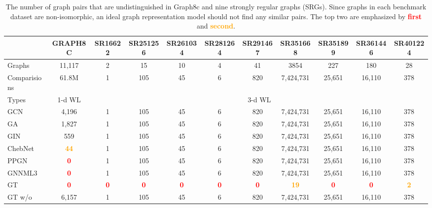 \documentclass[oneside]{article}
\begin{document}
\begin{table*}[t]
\centering
\caption{
The number of graph pairs that are undistinguished in Graph8c and nine 
strongly regular graphs (SRGs).
Since graphs in each benchmark dataset are non-isomorphic, an ideal graph representation model should not find any similar pairs.
The top two are emphasized by \textcolor{red}{\textbf{first}} and \textcolor{orange}{\textbf{second}}.
}

  \begin{adjustbox}{width=1\textwidth}
  \fontsize{10 pt}{13 pt}\selectfont
  \begin{tabular}{l  c  cc cccc ccc}
    \toprule
    & GRAPH8C & SR16622 &   SR251256 & SR261034 & SR281264 & SR291467 & SR351668 & SR351899 & SR361446 &  SR401224\\    \hline \hline
    

    
     Graphs & 11,117 &2 &15 & 10 & 4 & 41 & 3854 & 227 & 180 & 28  \\
    
     Comparisions &61.8M & 1 & 105 & 45 & 6 & 820 & 7,424,731 & 25,651 & 16,110 & 378  \\
    \cmidrule(lr){2-2} \cmidrule(lr){3-11} 
    
    Types &\multicolumn{1}{c}{1-d WL}  & \multicolumn{9}{c}{3-d WL} \\

     \hline
     
    GCN& 4,196 & 1  & 105  &  45  &6   &  820 & 7,424,731  & 25,651  & 16,110 &378  \\
    GA & 1,827 & 1  & 105  &  45  &6   &  820 & 7,424,731  & 25,651  & 16,110  &378  \\
     GIN& 559 & 1  & 105  &  45  &6   &  820 & 7,424,731  & 25,651  & 16,110  &378  \\
    ChebNet  &  \textcolor{orange}{\textbf{44}} & 1  & 105  &  45  &6   &  820 & 7,424,731  & 25,651  & 16,110  &378  \\
    PPGN  &  \textcolor{red}{\textbf{0}} & 1  & 105  &  45 &6   &  820 & 7,424,731  & 25,651 & 16,110  &378  \\
    GNNML3  &   \textcolor{red}{\textbf{0}} & 1  & 105  &  45  &6   &  820 & 7,424,731  & 25,651  & 16,110  &378  \\
    
    \hline

    GT &\textcolor{red}{\textbf{0}}& \textcolor{red}{\textbf{0}}  & \textcolor{red}{\textbf{0}}    &  \textcolor{red}{\textbf{0}}  &\textcolor{red}{\textbf{0}}   & \textcolor{red}{\textbf{ 0}} & \textcolor{orange}{\textbf{19}}  & \textcolor{red}{\textbf{0}}  & \textcolor{red}{\textbf{0}}  & \textcolor{orange}{\textbf{2}}  \\
    GT w/o  & 6,157 & 1  & 105  &  45  &6   &  820 & 7,424,731  & 25,651  & 16,110  &378  \\
 

\end{tabular}
\end{adjustbox}
\end{table*}
\end{document}
